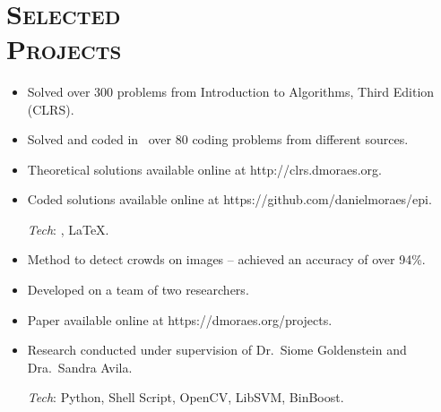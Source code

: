 \begin{resume}

\begin{formatb}
  \\
\end{formatb}

\section{\textsc{Selected\\Projects}}


\begin{position}
\vspace{1mm}
\begin{itemize}\small
\item Solved over 300 problems from Introduction to Algorithms, Third Edition (CLRS).
\item Solved and coded in \Cplusplus\ over 80 coding problems from different sources.
\item Theoretical solutions available online at http://clrs.dmoraes.org.
\item Coded solutions available online at https://github.com/danielmoraes/epi.

\vspace{1mm}
{\small \emph{Tech}: \Cplusplus, \LaTeX.}
\end{itemize}
\end{position}


\begin{position}
\vspace{1mm}
\begin{itemize}\small
\item Method to detect crowds on images {--} achieved an accuracy of over 94\%.
\item Developed on a team of two researchers.
\item Paper available online at https://dmoraes.org/projects.
\item Research conducted under supervision of Dr.\ Siome Goldenstein and
Dra.\ Sandra Avila.

\vspace{1mm}
{\small \emph{Tech}: Python, Shell Script, OpenCV, LibSVM, BinBoost.}
\end{itemize}
\end{position}


\end{resume}

